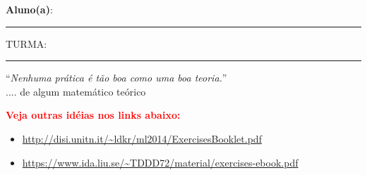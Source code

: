 \documentclass[11pt, a4paper,final]{article}
\begin{document}
\begin{large}
\begin{center}

\end{center}
\end{large} 

\textbf{Aluno(a)}: \noindent\rule{0.7\textwidth}{1pt} TURMA: \noindent\rule{0.05\textwidth}{1pt} 

\begin{flushright}
``{\em  Nenhuma prática é tão boa como uma boa teoria.}''\\
.... de algum matemático teórico
\end{flushright}
	
\textbf{\textcolor{red}{Veja outras idéias nos links abaixo:}}

\begin{itemize}
\item \url{http://disi.unitn.it/~ldkr/ml2014/ExercisesBooklet.pdf}
\item \url{https://www.ida.liu.se/~TDDD72/material/exercises-ebook.pdf}
\end{itemize}
\end{document}

